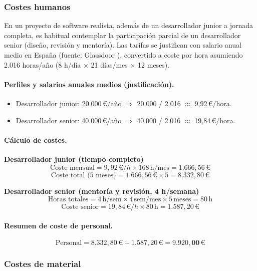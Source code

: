 \subsubsection{Costes humanos}

En un proyecto de software realista, además de un desarrollador junior a jornada completa, es habitual contemplar la participación parcial de un desarrollador senior (diseño, revisión y mentoría). Las tarifas se justifican con salario anual medio en España (fuente: Glassdoor \cite{glassdoor}), convertido a coste por hora asumiendo 2.016 horas/año (8 h/día \(\times\) 21 días/mes \(\times\) 12 meses).

\paragraph{Perfiles y salarios anuales medios (justificación).}
\begin{itemize}
  \item Desarrollador junior: 20.000\,€/año $\Rightarrow$ 20.000 / 2.016 $\approx$ 9,92\,€/hora.
  \item Desarrollador senior: 40.000\,€/año $\Rightarrow$ 40.000 / 2.016 $\approx$ 19,84\,€/hora.
\end{itemize}

\paragraph{Cálculo de costes.}
\noindent\textbf{Desarrollador junior (tiempo completo)}\\
\[
\text{Coste mensual} = 9{,}92\,€/h \times 168\,\text{h/mes} = 1.666{,}56\,€
\]
\[
\text{Coste total (5 meses)} = 1.666{,}56\,€ \times 5 = 8.332{,}80\,€
\]

\noindent\textbf{Desarrollador senior (mentoría y revisión, 4 h/semana)}\\
\[
\text{Horas totales} = 4\,\text{h/sem} \times 4\,\text{sem/mes} \times 5\,\text{meses} = 80\,\text{h}
\]
\[
\text{Coste senior} = 19{,}84\,€/h \times 80\,\text{h} = 1.587{,}20\,€
\]

\paragraph{Resumen de coste de personal.}
\[
\text{Personal} = 8.332{,}80\,€ + 1.587{,}20\,€ = \mathbf{9.920{,}00\,€}
\]

\subsubsection{Costes de material}

